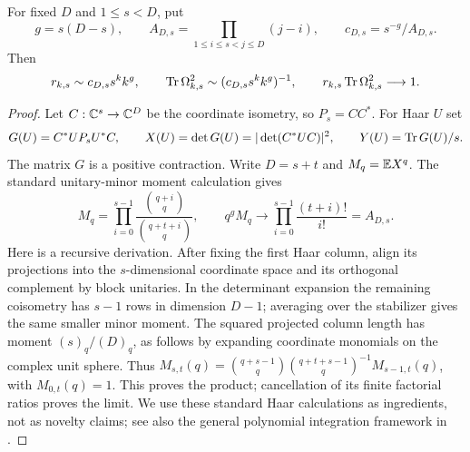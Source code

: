 \begin{theorem}\label{thm:flat-average}
For fixed $D$ and $1\le s<D$, put
\begin{equation}\label{eq:rank-constant}
 g=s(D-s),\qquad A_{D,s}=\prod_{1\le i\le s<j\le D}(j-i),\qquad
 c_{D,s}=s^{-g}/A_{D,s}.
\end{equation}
Then
\begin{equation}\label{eq:support-asymptotic}
 r_{k,s}\sim c_{D,s}s^kk^g,\qquad
 \operatorname{Tr}\Omega_{k,s}^2\sim(c_{D,s}s^kk^g)^{-1},\qquad
 r_{k,s}\operatorname{Tr}\Omega_{k,s}^2\longrightarrow1.
\end{equation}
\end{theorem}
\begin{proof}
Let $C:\mathbb C^s\to\mathbb C^D$ be the coordinate isometry, so $P_s=CC^*$. For Haar $U$ set
\[
 G(U)=C^*UP_sU^*C,\qquad X(U)=\det G(U)=|\det(C^*UC)|^2,
 \qquad Y(U)=\operatorname{Tr} G(U)/s.
\]
The matrix $G$ is a positive contraction. Write $D=s+t$ and $M_q=\mathbb E X^q$. The standard unitary-minor moment calculation gives
\begin{equation}\label{eq:minor-moment}
 M_q=\prod_{i=0}^{s-1}\frac{\binom{q+i}{q}}{\binom{q+t+i}{q}},
 \qquad q^gM_q\longrightarrow
 \prod_{i=0}^{s-1}\frac{(t+i)!}{i!}=A_{D,s}.
\end{equation}
Here is a recursive derivation. After fixing the first Haar column, align its projections into the $s$-dimensional coordinate space and its orthogonal complement by block unitaries. In the determinant expansion the remaining coisometry has $s-1$ rows in dimension $D-1$; averaging over the stabilizer gives the same smaller minor moment. The squared projected column length has moment $(s)_q/(D)_q$, as follows by expanding coordinate monomials on the complex unit sphere. Thus $M_{s,t}(q)=\binom{q+s-1}{q}\binom{q+t+s-1}{q}^{-1}M_{s-1,t}(q)$, with $M_{0,t}(q)=1$. This proves the product; cancellation of its finite factorial ratios proves the limit. We use these standard Haar calculations as ingredients, not as novelty claims; see also the general polynomial integration framework in \cite{collins-sniady}.


\end{proof}
